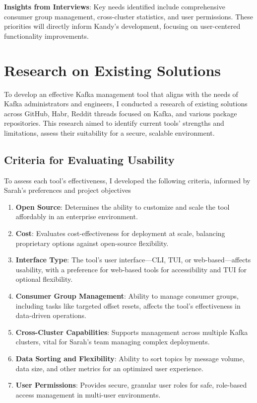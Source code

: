 \documentclass[10pt , a4paper]{report}
\begin{document}
\textbf{Insights from Interviews}: Key needs identified include comprehensive consumer group management, cross-cluster statistics, and user permissions. These priorities will directly inform Kandy’s development, focusing on user-centered functionality improvements.
\newpage
\section{Research on Existing Solutions}

To develop an effective Kafka management tool that aligns with the needs of Kafka administrators and engineers, I conducted a research of existing solutions across GitHub, Habr, Reddit threads focused on Kafka, and various package repositories. This research aimed to identify current tools’ strengths and limitations, assess their suitability for a secure, scalable environment.

\subsection{Criteria for Evaluating Usability}
To assess each tool's effectiveness, I developed the following criteria, informed by Sarah’s preferences and project objectives

\begin{enumerate}
    \item \textbf{Open Source}: Determines the ability to customize and scale the tool affordably in an enterprise environment.
    \item \textbf{Cost}: Evaluates cost-effectiveness for deployment at scale, balancing proprietary options against open-source flexibility.
    \item \textbf{Interface Type}: The tool’s user interface—CLI, TUI, or web-based—affects usability, with a preference for web-based tools for accessibility and TUI for optional flexibility.
    \item \textbf{Consumer Group Management}: Ability to manage consumer groups, including tasks like targeted offset resets, affects the tool's effectiveness in data-driven operations.
    \item \textbf{Cross-Cluster Capabilities}: Supports management across multiple Kafka clusters, vital for Sarah’s team managing complex deployments.
    \item \textbf{Data Sorting and Flexibility}: Ability to sort topics by message volume, data size, and other metrics for an optimized user experience.
    \item \textbf{User Permissions}: Provides secure, granular user roles for safe, role-based access management in multi-user environments.
\end{enumerate}
\end{document}
